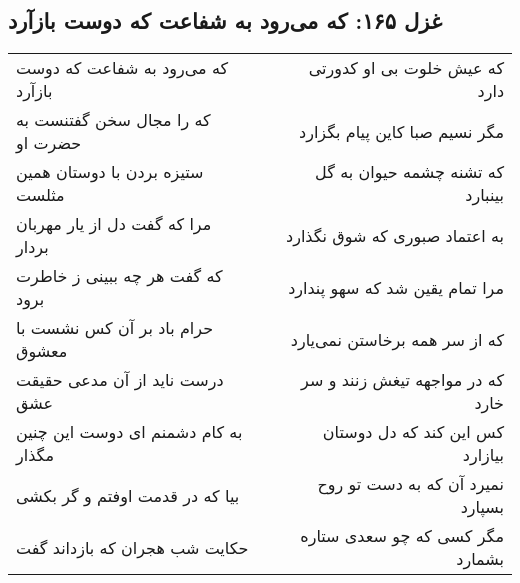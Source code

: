\begin{center}
\section*{غزل ۱۶۵: که می‌رود به شفاعت که دوست بازآرد}
\label{sec:165}
\begin{longtable}{l p{0.5cm} r}
که می‌رود به شفاعت که دوست بازآرد
&&
که عیش خلوت بی او کدورتی دارد
\\
که را مجال سخن گفتنست به حضرت او
&&
مگر نسیم صبا کاین پیام بگزارد
\\
ستیزه بردن با دوستان همین مثلست
&&
که تشنه چشمه حیوان به گل بینبارد
\\
مرا که گفت دل از یار مهربان بردار
&&
به اعتماد صبوری که شوق نگذارد
\\
که گفت هر چه ببینی ز خاطرت برود
&&
مرا تمام یقین شد که سهو پندارد
\\
حرام باد بر آن کس نشست با معشوق
&&
که از سر همه برخاستن نمی‌یارد
\\
درست ناید از آن مدعی حقیقت عشق
&&
که در مواجهه تیغش زنند و سر خارد
\\
به کام دشمنم ای دوست این چنین مگذار
&&
کس این کند که دل دوستان بیازارد
\\
بیا که در قدمت اوفتم و گر بکشی
&&
نمیرد آن که به دست تو روح بسپارد
\\
حکایت شب هجران که بازداند گفت
&&
مگر کسی که چو سعدی ستاره بشمارد
\\
\end{longtable}
\end{center}
